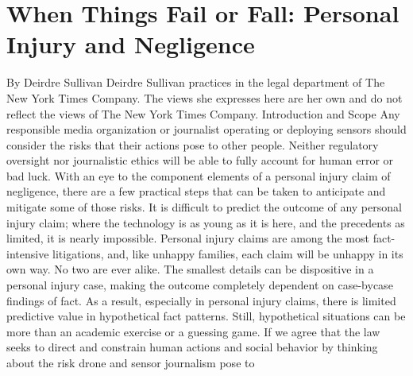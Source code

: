 \section{When Things Fail or Fall: Personal Injury and Negligence}
By Deirdre Sullivan
Deirdre Sullivan practices in the legal department of The New York Times Company. The views she
expresses here are her own and do not reflect the views of The New York Times Company.
Introduction and Scope
Any responsible media organization or journalist operating or deploying
sensors should consider the risks that their actions pose to other people.
Neither regulatory oversight nor journalistic ethics will be able to fully
account for human error or bad luck. With an eye to the component elements
of a personal injury claim of negligence, there are a few practical
steps that can be taken to anticipate and mitigate some of those risks.
It is difficult to predict the outcome of any personal injury claim; where
the technology is as young as it is here, and the precedents as limited, it is
nearly impossible. Personal injury claims are among the most fact-intensive
litigations, and, like unhappy families, each claim will be unhappy in its own
way. No two are ever alike. The smallest details can be dispositive in a personal
injury case, making the outcome completely dependent on case-bycase
findings of fact. As a result, especially in personal injury claims, there
is limited predictive value in hypothetical fact patterns. Still, hypothetical
situations can be more than an academic exercise or a guessing game. If we
agree that the law seeks to direct and constrain human actions and social
behavior by thinking about the risk drone and sensor journalism pose to

